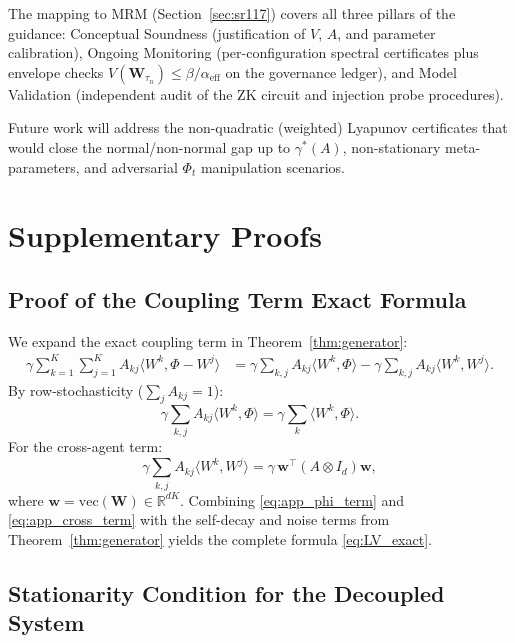 \documentclass[12pt]{article}
\theoremstyle{plain}
\theoremstyle{definition}
\newcommand{\R}{\mathbb{R}}
\newcommand{\W}{\mathbf{W}}
\newcommand{\ip}[2]{\langle #1, #2 \rangle}
\begin{document}
The mapping to MRM (Section~\ref{sec:sr117}) covers all three
pillars of the guidance: Conceptual Soundness (justification of $V$,
$A$, and parameter calibration), Ongoing Monitoring (per-configuration
spectral certificates plus envelope checks $V(\W_{\tau_n})\le\beta/\alpha_{\mathrm{eff}}$
on the governance ledger), and Model Validation
(independent audit of the ZK circuit and injection probe procedures).

Future work will address the non-quadratic (weighted) Lyapunov certificates
that would close the normal/non-normal gap up to $\gamma^*(A)$,
non-stationary meta-parameters, and adversarial $\Phi_t$ manipulation
scenarios.

\appendix

\section{Supplementary Proofs}
\label{app:proofs}

\subsection{Proof of the Coupling Term Exact Formula}

We expand the exact coupling term in Theorem~\ref{thm:generator}:
\begin{align*}
  \gamma \sum_{k=1}^K \sum_{j=1}^K A_{kj} \ip{W^k}{\Phi - W^j}
  &= \gamma \sum_{k,j} A_{kj} \ip{W^k}{\Phi}
    - \gamma \sum_{k,j} A_{kj} \ip{W^k}{W^j}.
\end{align*}
By row-stochasticity ($\sum_j A_{kj} = 1$):
\begin{equation}
  \gamma \sum_{k,j} A_{kj} \ip{W^k}{\Phi}
  = \gamma \sum_k \ip{W^k}{\Phi}.
  \label{eq:app_phi_term}
\end{equation}
For the cross-agent term:
\begin{equation}
  \gamma \sum_{k,j} A_{kj} \ip{W^k}{W^j}
  = \gamma \, \mathbf{w}^\top (A \otimes I_d) \mathbf{w},
  \label{eq:app_cross_term}
\end{equation}
where $\mathbf{w} = \mathrm{vec}(\W) \in \R^{dK}$.  Combining
\eqref{eq:app_phi_term} and \eqref{eq:app_cross_term} with the
self-decay and noise terms from Theorem~\ref{thm:generator} yields the
complete formula \eqref{eq:LV_exact}.

\subsection{Stationarity Condition for the Decoupled System}
\end{document}
